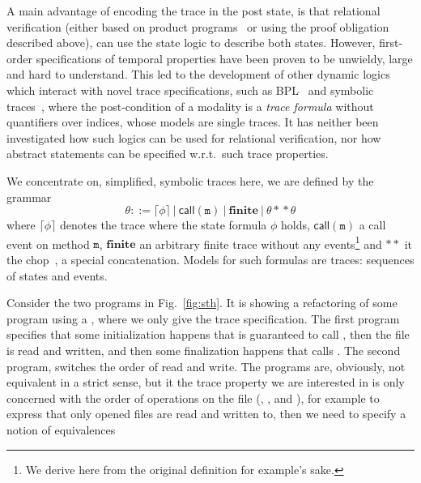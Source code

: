 A main advantage of encoding the trace in the post state, is that relational verification (either based on product programs~\cite{product} or using the proof obligation described above),
can use the state logic to describe both states.
However, first-order specifications of temporal properties have been proven to be unwieldy, large and hard to understand. 
This led to the development of other dynamic logics which interact with novel trace specifications, such as BPL~\cite{DBLP:conf/tableaux/Kamburjan19} and symbolic traces~\cite{DBLP:conf/tableaux/BubelDHN15}, where the post-condition of a modality is a \emph{trace formula} without quantifiers over indices, whose models are single traces.
It has neither been investigated how such logics can be used for relational verification, nor how abstract statements can be specified w.r.t.\ such trace properties.


We concentrate on, simplified, symbolic traces here, we are defined by the grammar
\[\theta ::= \lceil \phi \rceil ~|~ \mathsf{call}(\mathtt{m}) ~|~ \mathbf{finite} ~|~ \theta \ast\!\ast \theta \]
where $\lceil \phi \rceil$ denotes the trace where the state formula $\phi$ holds, $\mathsf{call}(\mathtt{m})$ a call event on method $\mathtt{m}$, $\mathbf{finite}$ an arbitrary finite trace without any events\footnote{We derive here from the original definition for example's sake.} and $\ast\ast$ it the chop~\cite{DBLP:conf/tableaux/BubelDHN15}, a special concatenation. Models for such formulas are traces: sequences of states and events.

Consider the two programs in Fig.~\ref{fig:sth}. It is showing a refactoring of some program using a , where we only give the trace specification.
The first program specifies that some initialization happens that is guaranteed to call , then the file is read and written,
and then some finalization happens that calls . The second program, switches the order of read and write.
The programs are, obviously, not equivalent in a strict sense, but it the trace property we are interested in is only concerned with the order of operations on the file 
(, ,  and ), for example to express that only opened files are read and written to, then we need to specify a notion of equivalences


